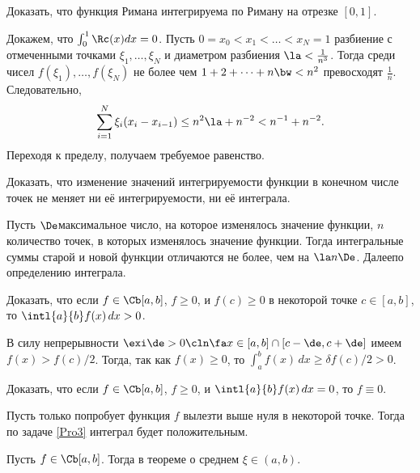 \documentclass[a4paper]{article}
\begin{document}
\begin{problem}
Доказать, что функция Римана
интегрируема по Риману на отрезке $[0,1]$.
\end{problem}
\begin{solution}
Докажем, что $\int_0^1\Rc(x)dx=0$. Пусть $0=x_0<x_1<\ldots<x_N=1$\т
разбиение с отмеченными точками $\xi_1,\ldots,\xi_N$ и диаметром разбиения
$\la<\frac{1}{n^3}$. Тогда среди чисел $f(\xi_1),\ldots,f(\xi_N)$ не более
чем $1+2+\cdots+n\bw<n^2$ превосходят $\frac{1}{n}$. Следовательно,
$$\sum_{i=1}^N \xi_i (x_i- x_{i-1})\le n^2\la+n^{-2}<n^{-1}+n^{-2}.$$
Переходя к пределу, получаем требуемое равенство.
\end{solution}

\begin{problem}
Доказать, что изменение значений интегрируемости функции в конечном числе точек не меняет ни её интегрируемости, ни её
интеграла.
\end{problem}
\begin{solution}
Пусть $\De$\т  максимальное число, на которое изменялось значение функции,
$n$\т количество точек, в которых изменялось значение функции. Тогда
интегральные суммы старой и новой функции отличаются не более, чем на
$\la n\De$. Далее\т по определению интеграла.
\end{solution}

\begin{problem}
\label{Pro3}Доказать, что если $f \in \Cb[a,b]$, $f \ge 0$, и $f(c) \ge 0$ в некоторой точке $c \in [a,b]$, то $\intl{a}{b}f(x)\,dx > 0$.
\end{problem}
\begin{solution}
В силу непрерывности $\exi \de > 0\cln \fa x\in [a,b] \cap [c-\de,c+\de]$ имеем $f(x) > f(c)/2$.
Тогда, так как $f(x)\ge 0$, то $\int_a^b f(x)\,dx\ge \delta f(c)/2>0$.
\end{solution}

\begin{problem}
Доказать, что если $f \in \Cb[a,b]$, $f \ge 0$, и $\intl{a}{b}f(x)\,dx = 0$, то $f \equiv 0$.
\end{problem}
\begin{solution}
Пусть только попробует функция $f$ вылезти выше нуля в некоторой точке. Тогда по задаче \ref{Pro3} интеграл будет
положительным.
\end{solution}

\begin{problem}
Пусть $f \in \Cb[a,b]$. Тогда в теореме о среднем $\xi \in (a,b)$.
\end{problem}
\end{document}
